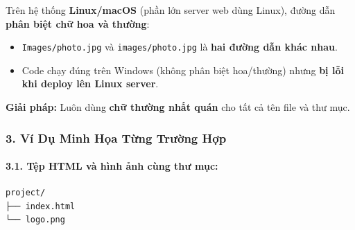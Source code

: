 \documentclass[11pt,oneside]{book}
\newcommand{\thd}[1]{\textcolor{white}{\textbf{\strut #1}}}
\newcommand{\codeinline}[1]{\textcolor{accentOrange}{\texttt{#1}}}
\begin{document}
\begin{warnBox}
Trên hệ thống \textbf{Linux/macOS} (phần lớn server web dùng Linux), đường dẫn \textbf{phân biệt chữ hoa và thường}:
\begin{itemize}[leftmargin=1.5em, itemsep=2pt, parsep=0pt]
    \item \codeinline{Images/photo.jpg} và \codeinline{images/photo.jpg} là \textbf{hai đường dẫn khác nhau}.
    \item Code chạy đúng trên Windows (không phân biệt hoa/thường) nhưng \textbf{bị lỗi khi deploy lên Linux server}.
\end{itemize}
\textbf{Giải pháp:} Luôn dùng \textbf{chữ thường nhất quán} cho tất cả tên file và thư mục.
\end{warnBox}

\begin{prettyTableBox}
\end{prettyTableBox}

\subsubsection{3. Ví Dụ Minh Họa Từng Trường Hợp}

\paragraph{3.1. Tệp HTML và hình ảnh cùng thư mục:}

\begin{codeWindow}
\begin{lstlisting}[language=HTML5]
project/
├── index.html
└── logo.png
\end{lstlisting}
\end{codeWindow}
\end{document}
